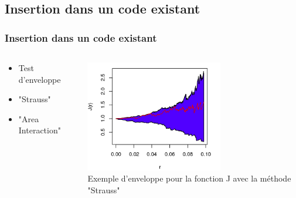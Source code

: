 \documentclass{beamer}
\theoremstyle{remark}
\theoremstyle{plain}
\begin{document}
\subsection{Insertion dans un code existant}
\begin{frame}
    \frametitle{Insertion dans un code existant}
    \vspace{-0.5cm}
    \begin{columns}
    \begin{column}{0.3\linewidth}
        \begin{itemize}
            \item{Test d'enveloppe} 
             \vspace{0.5cm}
            \item{"Strauss"} 
             \vspace{0.5cm}
            \item{"Area Interaction"}
        \end{itemize}
    \end{column}
    \begin{column}{0.45\linewidth}
      \begin{center}
        \includegraphics[width=6cm]{images/enveloppeJ.png}\\
        Exemple d'enveloppe pour la fonction J avec la méthode "Strauss"
      \end{center}
    \end{column}
  \end{columns}
\end{frame}
\end{document}
